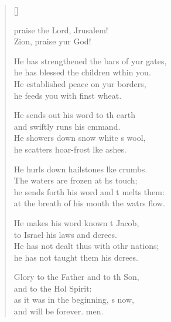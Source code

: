 \settowidth{\versewidth}{He has strengthened the bars of your gates, *}
\begin{verse}[\versewidth]
  \begin{patverse}
     praise the Lord, Jrusalem!\Med\\
    Zion, praise yur God!
    
    He has strengthened the bars of yur gates,\Med\\
    he has blessed the children w\pointup{\i}thin you.\\
    He established peace on yur borders,\Med\\
    he feeds you with finst wheat.
    
    He sends out his word to th earth\Med\\
    and swiftly runs his cmmand.\\
    He showers down snow white s wool,\Med\\
    he scatters hoar-frost l\pointup{\i}ke ashes.
    
    He hurls down hailstones l\pointup{\i}ke crumbs.\Med\\
    The waters are frozen at h\pointup{\i}s touch;\\
    he sends forth his word and \pointup{\i}t melts them:\Med\\
    at the breath of his mouth the watrs flow.
    
    He makes his word known t Jacob,\Med\\
    to Israel his laws and dcrees.\\
    He has not dealt thus with othr nations;\Med\\
    he has not taught them his dcrees.
    
    Glory to the Father and to th Son,\Med\\
    and to the Hol Spirit:\\
    as it was in the beginning, \pointup{\i}s now,\Med\\
    and will be forever. men.
  \end{patverse}
\end{verse}

